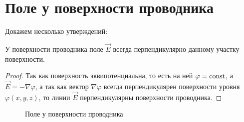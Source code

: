 \section{Поле у поверхности проводника}

    Докажем несколько утверждений:

    \begin{proposition}
        У поверхности проводника поле \( \vec{E} \) всегда перпендикулярно
        данному участку поверхности.
    \end{proposition}

    \begin{proof}
        Так как поверхность эквипотенциальна, то есть на ней
        \( \varphi = \mathrm{const} \), а \( \vec{E} = -\nabla\varphi \), а так как
        вектор \( \nabla\varphi \) всегда перпендикулярен поверхности уровня
        \( \varphi(x, y, z) \), то линии \( \vec{E} \) перпендикулярны
        поверхности проводника.
    \end{proof}

    \begin{figure}[!b]
        \center
        \hfill
        \hfill
        \caption{Поле у поверхности проводника}
    \end{figure}

